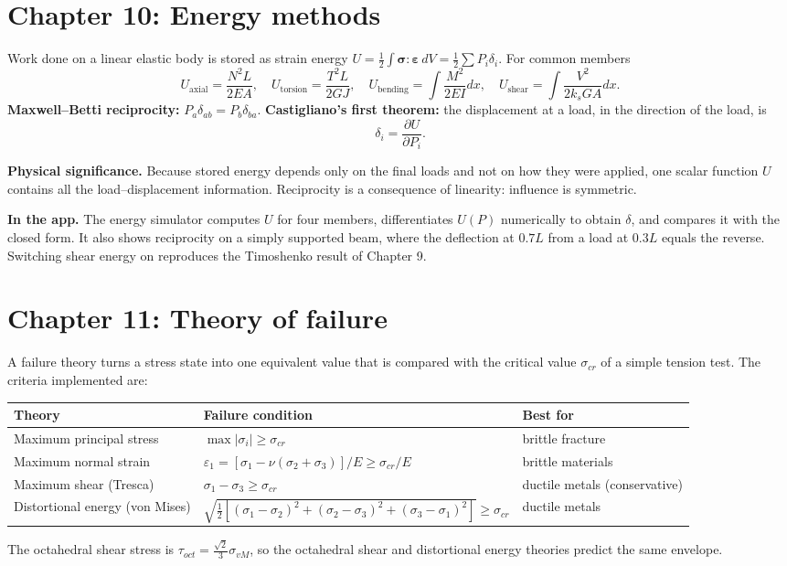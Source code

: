 \documentclass[11pt,a4paper]{article}
\newcommand{\tens}[1]{\bm{#1}}
\newcommand{\app}[1]{\par\smallskip\noindent\textbf{In the app.} #1}
\newcommand{\sig}[1]{\par\smallskip\noindent\textbf{Physical significance.} #1}
\begin{document}
\section{Chapter 10: Energy methods}
Work done on a linear elastic body is stored as strain energy $U=\tfrac12\int\tens{\sigma}:\tens{\varepsilon}\,dV=\tfrac12\sum P_i\delta_i$. For common members
\begin{equation}
U_{\text{axial}}=\frac{N^2L}{2EA},\quad
U_{\text{torsion}}=\frac{T^2L}{2GJ},\quad
U_{\text{bending}}=\int\frac{M^2}{2EI}dx,\quad
U_{\text{shear}}=\int\frac{V^2}{2k_sGA}dx .
\end{equation}
\textbf{Maxwell--Betti reciprocity:} $P_a\delta_{ab}=P_b\delta_{ba}$. \textbf{Castigliano's first theorem:} the displacement at a load, in the direction of the load, is
\begin{equation}
\delta_i=\frac{\partial U}{\partial P_i}.
\end{equation}
\sig{Because stored energy depends only on the final loads and not on how they were applied, one scalar function $U$ contains all the load--displacement information. Reciprocity is a consequence of linearity: influence is symmetric.}
\app{The energy simulator computes $U$ for four members, differentiates $U(P)$ numerically to obtain $\delta$, and compares it with the closed form. It also shows reciprocity on a simply supported beam, where the deflection at $0.7L$ from a load at $0.3L$ equals the reverse. Switching shear energy on reproduces the Timoshenko result of Chapter 9.}

\section{Chapter 11: Theory of failure}
A failure theory turns a stress state into one equivalent value that is compared with the critical value $\sigma_{cr}$ of a simple tension test. The criteria implemented are:
\begin{center}
\begin{tabular}{@{}p{3.6cm}p{7.2cm}p{3.2cm}@{}}
\toprule
Theory & Failure condition & Best for\\
\midrule
Maximum principal stress & $\max|\sigma_i|\ge\sigma_{cr}$ & brittle fracture\\
Maximum normal strain & $\varepsilon_1=[\sigma_1-\nu(\sigma_2+\sigma_3)]/E\ge\sigma_{cr}/E$ & brittle materials\\
Maximum shear (Tresca) & $\sigma_1-\sigma_3\ge\sigma_{cr}$ & ductile metals (conservative)\\
Distortional energy (von Mises) & $\sqrt{\tfrac12[(\sigma_1-\sigma_2)^2+(\sigma_2-\sigma_3)^2+(\sigma_3-\sigma_1)^2]}\ge\sigma_{cr}$ & ductile metals\\
\bottomrule
\end{tabular}
\end{center}
The octahedral shear stress is $\tau_{oct}=\frac{\sqrt2}{3}\sigma_{vM}$, so the octahedral shear and distortional energy theories predict the same envelope.
\end{document}
